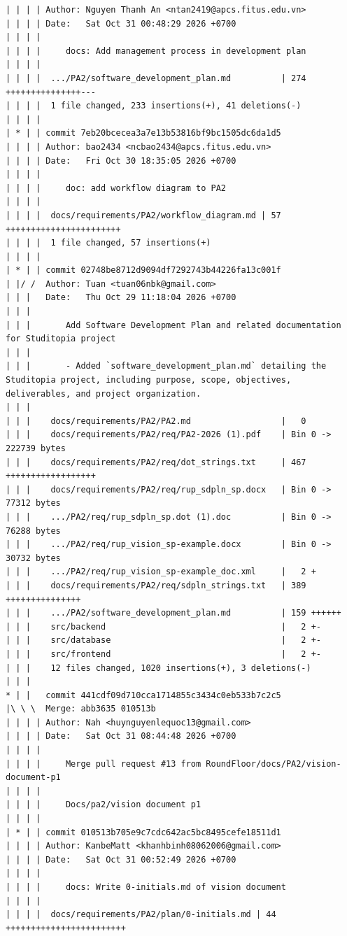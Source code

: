 \documentclass[12pt]{article}
\begin{document}
\begin{lstlisting}[numbers=none,breaklines=true]
| | | | Author: Nguyen Thanh An <ntan2419@apcs.fitus.edu.vn>
| | | | Date:   Sat Oct 31 00:48:29 2026 +0700
| | | |
| | | |     docs: Add management process in development plan
| | | |
| | | |  .../PA2/software_development_plan.md          | 274 +++++++++++++++---
| | | |  1 file changed, 233 insertions(+), 41 deletions(-)
| | | |
| * | | commit 7eb20bcecea3a7e13b53816bf9bc1505dc6da1d5
| | | | Author: bao2434 <ncbao2434@apcs.fitus.edu.vn>
| | | | Date:   Fri Oct 30 18:35:05 2026 +0700
| | | |
| | | |     doc: add workflow diagram to PA2
| | | |
| | | |  docs/requirements/PA2/workflow_diagram.md | 57 +++++++++++++++++++++++
| | | |  1 file changed, 57 insertions(+)
| | | |
| * | | commit 02748be8712d9094df7292743b44226fa13c001f
| |/ /  Author: Tuan <tuan06nbk@gmail.com>
| | |   Date:   Thu Oct 29 11:18:04 2026 +0700
| | |
| | |       Add Software Development Plan and related documentation for Studitopia project
| | |
| | |       - Added `software_development_plan.md` detailing the Studitopia project, including purpose, scope, objectives, deliverables, and project organization.
| | |
| | |    docs/requirements/PA2/PA2.md                  |   0
| | |    docs/requirements/PA2/req/PA2-2026 (1).pdf    | Bin 0 -> 222739 bytes
| | |    docs/requirements/PA2/req/dot_strings.txt     | 467 ++++++++++++++++++
| | |    docs/requirements/PA2/req/rup_sdpln_sp.docx   | Bin 0 -> 77312 bytes
| | |    .../PA2/req/rup_sdpln_sp.dot (1).doc          | Bin 0 -> 76288 bytes
| | |    .../PA2/req/rup_vision_sp-example.docx        | Bin 0 -> 30732 bytes
| | |    .../PA2/req/rup_vision_sp-example_doc.xml     |   2 +
| | |    docs/requirements/PA2/req/sdpln_strings.txt   | 389 +++++++++++++++
| | |    .../PA2/software_development_plan.md          | 159 ++++++
| | |    src/backend                                   |   2 +-
| | |    src/database                                  |   2 +-
| | |    src/frontend                                  |   2 +-
| | |    12 files changed, 1020 insertions(+), 3 deletions(-)
| | |
* | |   commit 441cdf09d710cca1714855c3434c0eb533b7c2c5
|\ \ \  Merge: abb3635 010513b
| | | | Author: Nah <huynguyenlequoc13@gmail.com>
| | | | Date:   Sat Oct 31 08:44:48 2026 +0700
| | | |
| | | |     Merge pull request #13 from RoundFloor/docs/PA2/vision-document-p1
| | | |
| | | |     Docs/pa2/vision document p1
| | | |
| * | | commit 010513b705e9c7cdc642ac5bc8495cefe18511d1
| | | | Author: KanbeMatt <khanhbinh08062006@gmail.com>
| | | | Date:   Sat Oct 31 00:52:49 2026 +0700
| | | |
| | | |     docs: Write 0-initials.md of vision document
| | | |
| | | |  docs/requirements/PA2/plan/0-initials.md | 44 ++++++++++++++++++++++++

\end{lstlisting}
\end{document}
